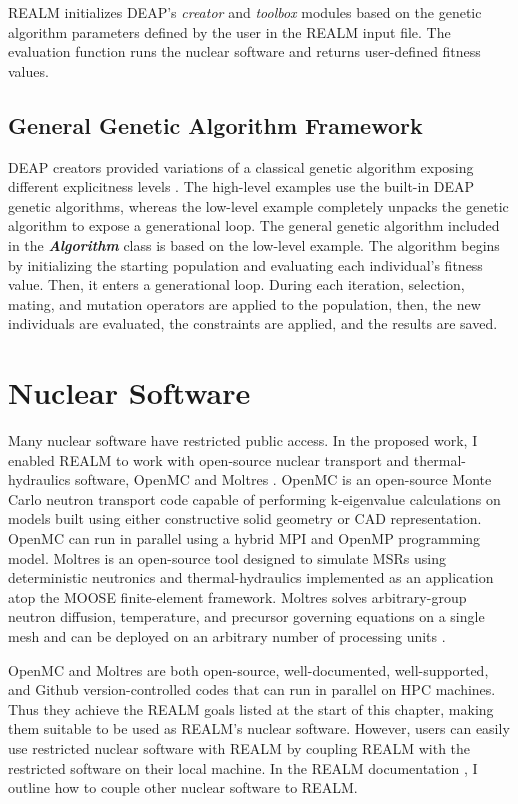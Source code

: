 \gls{REALM} initializes \gls{DEAP}'s \textit{creator} and \textit{toolbox} modules 
based on the genetic algorithm parameters defined by the user in the \gls{REALM} 
input file. 
The evaluation function runs the nuclear software and returns user-defined 
fitness values. 

\subsection{General Genetic Algorithm Framework}
\gls{DEAP} creators provided variations of a classical genetic algorithm 
exposing different explicitness levels \cite{fortin_deap_2012}. 
The high-level examples use the built-in \gls{DEAP} genetic algorithms, 
whereas the low-level example completely unpacks the genetic algorithm to expose 
a generational loop. 
The general genetic algorithm included in the \textbf{\textit{Algorithm}} class 
is based on the low-level example. 
The algorithm begins by initializing the starting population and evaluating 
each individual's fitness value. 
Then, it enters a generational loop. 
During each iteration, selection, mating, and mutation operators are applied to 
the population, then, the new individuals are evaluated, the constraints are 
applied, and the results are saved.


\section{Nuclear Software}
Many nuclear software have restricted public access. 
In the proposed work, I enabled \gls{REALM} to work with open-source nuclear 
transport and thermal-hydraulics software, OpenMC \cite{romano_openmc_2013} 
and Moltres \cite{lindsay_introduction_2018}.  
OpenMC is an open-source Monte Carlo neutron transport code capable of 
performing k-eigenvalue calculations on models built using either constructive 
solid geometry or CAD representation. 
OpenMC can run in parallel using a hybrid \gls{MPI} and OpenMP programming model. 
Moltres is an open-source tool designed to simulate \glspl{MSR} using 
deterministic neutronics and thermal-hydraulics implemented as an application 
atop the \gls{MOOSE} finite-element framework.  
Moltres solves arbitrary-group neutron diffusion, temperature, and precursor 
governing equations on a single mesh and can be deployed on an arbitrary number 
of processing units \cite{lindsay_introduction_2018}.

OpenMC and Moltres are both open-source, well-documented, well-supported, and 
Github version-controlled codes that can run in parallel on \gls{HPC} machines.
Thus they achieve the \gls{REALM} goals listed at the start of this chapter, 
making them suitable to be used as \gls{REALM}'s nuclear software.
However, users can easily use restricted nuclear software with \gls{REALM} 
by coupling \gls{REALM} with the restricted software on their local machine. 
In the \gls{REALM} documentation \cite{chee_arfcrealm_2021}, I outline how to couple 
other nuclear software to \gls{REALM}. 

